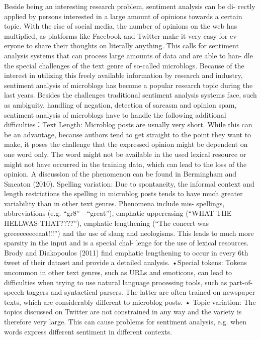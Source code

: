 \documentclass[twocolumn]{svjour3}          %
\begin{document}
Beside being an interesting research problem, sentiment analysis can be di- rectly applied by persons interested in a large amount of opinions towards a certain topic. 
With the rise of social media, the number of opinions on the web has multiplied, as platforms like Facebook and Twitter make it very easy for ev- eryone to share their thoughts on literally anything. This calls for sentiment analysis systems that can process large amounts of data and are able to han- dle the special challenges of the text genre of so-called microblogs. Because of the interest in utilizing this freely available information by research and industry, sentiment analysis of microblogs has become a popular research topic during the last years. Besides the challenges traditional sentiment analysis systems face, such as ambiguity, handling of negation, detection of sarcasm and opinion spam, sentiment analysis of microblogs have to handle the following additional difficulties：Text Length: Microblog posts are usually very short. While this can be an advantage, because authors tend to get straight to the point they want to make, it poses the challenge that the expressed opinion might be dependent on one word only. The word might not be available in the used lexical resource or might not have occurred in the training data, which can lead to the loss of the opinion. A discussion of the phenomenon can be found in Bermingham and Smeaton (2010).
Spelling variation: Due to spontaneity, the informal context and length restrictions the spelling in microblog posts tends to have much greater variability than in other text genres. Phenomena include mis- spellings, abbreviations (e.g. “gr8” - “great”), emphatic uppercasing (“WHAT THE HELLWAS THAT????”), emphatic lengthening (“The concert was greeeeeeeeeaat!!!”) and the use of slang and neologisms. This leads to much more sparsity in the input and is a special chal- lenge for the use of lexical resources. Brody and Diakopoulos (2011) find emphatic lengthening to occur in every 6th tweet of their dataset and provide a detailed analysis.
•Special tokens: Tokens uncommon in other text genres, such as URLs and emoticons, can lead to difficulties when trying to use natural language processing tools, such as part-of-speech taggers and syntactical parsers. The latter are often trained on newspaper texts, which are considerably different to microblog posts.
• Topic variation: The topics discussed on Twitter are not constrained in any way and the variety is therefore very large. This can cause problems for sentiment analysis, e.g. when words express different sentiment in different contexts.
\end{document}

